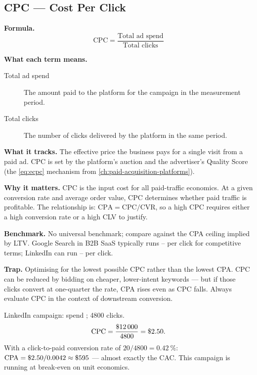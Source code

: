 \subsection{CPC --- Cost Per Click}

\textbf{Formula.}
\[
  \mathrm{CPC} = \frac{\text{Total ad spend}}{\text{Total clicks}}
\]

\textbf{What each term means.}
\begin{description}
  \item[Total ad spend] The amount paid to the platform for the campaign in the measurement
    period.
  \item[Total clicks] The number of clicks delivered by the platform in the same period.
\end{description}

\textbf{What it tracks.} The effective price the business pays for a single visit from a
paid ad. CPC is set by the platform's auction and the advertiser's Quality Score (the
\cref{eq:ecpc} mechanism from \cref{ch:paid-acquisition-platforms}).

\textbf{Why it matters.} CPC is the input cost for all paid-traffic economics. At a given
conversion rate and average order value, CPC determines whether paid traffic is profitable.
The relationship is: $\mathrm{CPA} = \mathrm{CPC} / \mathrm{CVR}$, so a high CPC requires
either a high conversion rate or a high CLV to justify.

\textbf{Benchmark.} No universal benchmark; compare against the CPA ceiling implied by LTV.
Google Search in B2B SaaS typically runs -- per click for competitive
terms; LinkedIn can run -- per click.

\textbf{Trap.} Optimising for the lowest possible CPC rather than the lowest CPA. CPC can
be reduced by bidding on cheaper, lower-intent keywords --- but if those clicks convert at
one-quarter the rate, CPA rises even as CPC falls. Always evaluate CPC in the context of
downstream conversion.

\begin{example}
LinkedIn campaign: spend ; \num{4800} clicks.
\[
  \mathrm{CPC} = \frac{\$\num{12000}}{4800} = \$\num{2.50}.
\]
With a click-to-paid conversion rate of $20/4800 = \qty{0.42}{\percent}$:
$\mathrm{CPA} = \$\num{2.50}/0.0042 \approx \$\num{595}$ --- almost exactly the 
CAC. This campaign is running at break-even on unit economics.
\end{example}


